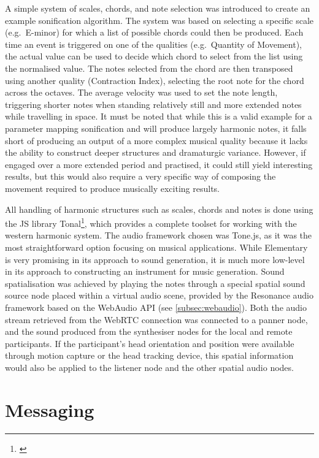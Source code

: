 A simple system of scales, chords, and note selection was introduced to create an example sonification algorithm.
The system was based on selecting a specific scale (e.g.\ E-minor) for which a list of possible chords could then be produced.
Each time an event is triggered on one of the qualities (e.g.\ Quantity of Movement), the actual value can be used to decide which chord to select from the list using the normalised value.
The notes selected from the chord are then transposed using another quality (Contraction Index), selecting the root note for the chord across the octaves.
The average velocity was used to set the note length, triggering shorter notes when standing relatively still and more extended notes while travelling in space.
It must be noted that while this is a valid example for a parameter mapping sonification and will produce largely harmonic notes, it falls short of producing an output of a more complex musical quality because it lacks the ability to construct deeper structures and dramaturgic variance.
However, if engaged over a more extended period and practised, it could still yield interesting results, but this would also require a very specific way of composing the movement required to produce musically exciting results.

All handling of harmonic structures such as scales, chords and notes is done using the \ac{JS} library Tonal\footnote{\url{}}, which provides a complete toolset for working with the western harmonic system.
The audio framework chosen was Tone.js, as it was the most straightforward option focusing on musical applications.
While Elementary is very promising in its approach to sound generation, it is much more low-level in its approach to constructing an instrument for music generation.
Sound spatialisation was achieved by playing the notes through a special spatial sound source node placed within a virtual audio scene, provided by the Resonance audio framework based on the WebAudio \ac{API} (see \autoref{subsec:webaudio}).
Both the audio stream retrieved from the \ac{WebRTC} connection was connected to a panner node, and the sound produced from the synthesiser nodes for the local and remote participants.
If the participant's head orientation and position were available through motion capture or the head tracking device, this spatial information would also be applied to the listener node and the other spatial audio nodes.

\section{Messaging}
\label{sec:messaging}


